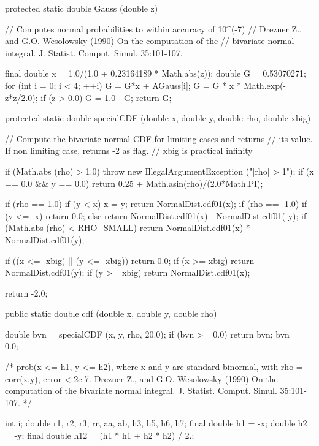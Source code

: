 \begin{code} \begin{hide}

   protected static double Gauss (double z) {
       // Computes normal probabilities to within accuracy of 10^(-7)
       // Drezner Z., and G.O. Wesolowsky (1990) On the computation of the
       // bivariate normal integral.  J. Statist. Comput. Simul. 35:101-107.

       final double x = 1.0/(1.0 + 0.23164189 * Math.abs(z));
       double G = 0.53070271;
       for (int i = 0; i < 4; ++i)
          G = G*x + AGauss[i];
       G = G * x * Math.exp(-z*z/2.0);
       if (z > 0.0)
          G = 1.0 - G;
       return G;
   }


   protected static double specialCDF (double x, double y, double rho, double xbig) {
      // Compute the bivariate normal CDF for limiting cases and returns
      // its value. If non limiting case, returns -2 as flag.
      // xbig is practical infinity

      if (Math.abs (rho) > 1.0)
         throw new IllegalArgumentException ("|rho| > 1");
      if (x == 0.0 && y == 0.0)
         return 0.25 + Math.asin(rho)/(2.0*Math.PI);

      if (rho == 1.0) {
         if (y < x)
            x = y;
         return NormalDist.cdf01(x);
      }
      if (rho == -1.0) {
         if (y <= -x)
            return 0.0;
         else
            return NormalDist.cdf01(x) - NormalDist.cdf01(-y);
      }
      if (Math.abs (rho) < RHO_SMALL)
         return NormalDist.cdf01(x) * NormalDist.cdf01(y);

      if ((x <= -xbig) || (y <= -xbig))
         return 0.0;
      if (x >= xbig)
         return NormalDist.cdf01(y);
      if (y >= xbig)
         return NormalDist.cdf01(x);

      return -2.0;
   }\end{hide}
   
   public static double cdf (double x, double y, double rho) \begin{hide} {
      double bvn = specialCDF (x, y, rho, 20.0);
      if (bvn >= 0.0)
         return bvn;
      bvn = 0.0;

      /* prob(x <= h1, y <= h2), where x and y are standard binormal, 
         with rho = corr(x,y),  error < 2e-7.
         Drezner Z., and G.O. Wesolowsky (1990) On the computation of the
         bivariate normal integral.  J. Statist. Comput. Simul. 35:101-107. */

      int i;
      double r1, r2, r3, rr, aa, ab, h3, h5, h6, h7;
      final double h1 = -x;
      double h2 = -y;
      final double h12 = (h1 * h1 + h2 * h2) / 2.;

}
\end{hide}
\end{code}

